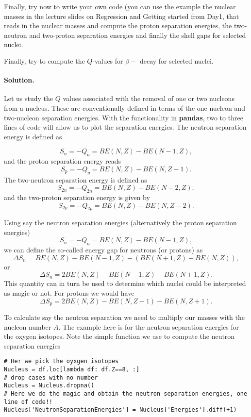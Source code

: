 \documentclass[%
oneside,                 %
final,                   %
10pt]{article}
\newenvironment{doconceexercise}{}{}
\newcounter{doconceexercisecounter}
\begin{document}
\begin{doconceexercise}



Finally, try now to write your own code (you can use the example the nuclear masses in the lecture slides on Regression and Getting started from Day1, that reads in the nuclear masses and
compute the proton separation energies, the two-neutron and two-proton separation energies and finally the shell gaps for selected nuclei.

Finally, try to compute the $Q$-values for $\beta-$ decay for selected nuclei.


\paragraph{Solution.}
Let us study the $Q$ values associated with the removal of one or two nucleons from
a nucleus. These are conventionally defined in terms of the one-nucleon and two-nucleon
separation energies. With the functionality in \textbf{pandas}, two to three lines of code will allow us to plot the separation energies.
The neutron separation energy is defined as 

\[
S_n= -Q_n= BE(N,Z)-BE(N-1,Z),
\]
and the proton separation energy reads
\[
S_p= -Q_p= BE(N,Z)-BE(N,Z-1).
\]
The two-neutron separation energy is defined as
\[
S_{2n}= -Q_{2n}= BE(N,Z)-BE(N-2,Z),
\]
and  the two-proton separation energy is given by
\[
S_{2p}= -Q_{2p}= BE(N,Z)-BE(N,Z-2).
\]

Using say the neutron separation energies (alternatively the proton separation energies)
\[
S_n= -Q_n= BE(N,Z)-BE(N-1,Z),
\]
we can define the so-called energy gap for neutrons (or protons) as 
\[
\Delta S_n= BE(N,Z)-BE(N-1,Z)-\left(BE(N+1,Z)-BE(N,Z)\right),
\]
or 
\[
\Delta S_n= 2BE(N,Z)-BE(N-1,Z)-BE(N+1,Z).
\]
This quantity can in turn be used to determine which nuclei could be interpreted as  magic or not. 
For protons we would have 
\[
\Delta S_p= 2BE(N,Z)-BE(N,Z-1)-BE(N,Z+1).
\]

To calculate say the neutron separation we need to multiply our masses with the nucleon number $A$.
The example here is for the neutron separation energies for the oxygen isotopes.
Note the simple function we use to compute the neutron separation energies
\begin{verbatim}
# Her we pick the oyxgen isotopes
Nucleus = df.loc[lambda df: df.Z==8, :]
# drop cases with no number
Nucleus = Nucleus.dropna()
# Here we do the magic and obtain the neutron separation energies, one line of code!!
Nucleus['NeutronSeparationEnergies'] = Nucleus['Energies'].diff(+1)
\end{verbatim}


\end{doconceexercise}
\end{document}
